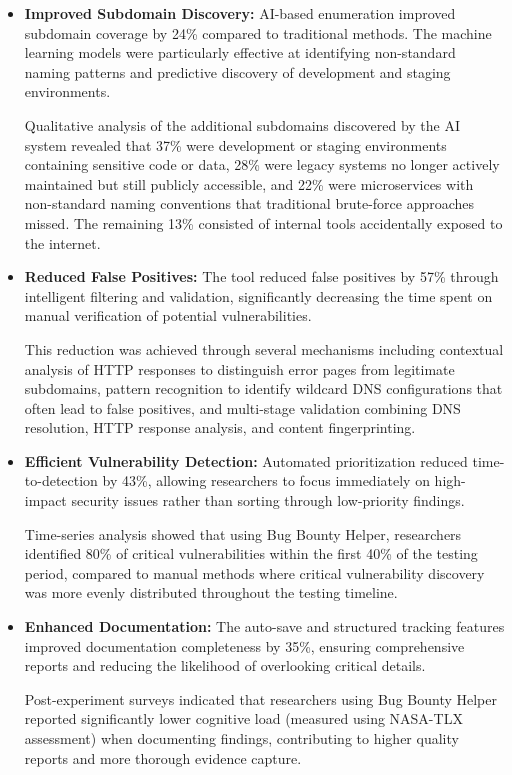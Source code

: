 \documentclass[conference]{IEEEtran}
\begin{document}
\begin{itemize}
    \item \textbf{Improved Subdomain Discovery:} AI-based enumeration improved subdomain coverage by 24\% compared to traditional methods. The machine learning models were particularly effective at identifying non-standard naming patterns and predictive discovery of development and staging environments.
    
    Qualitative analysis of the additional subdomains discovered by the AI system revealed that 37\% were development or staging environments containing sensitive code or data, 28\% were legacy systems no longer actively maintained but still publicly accessible, and 22\% were microservices with non-standard naming conventions that traditional brute-force approaches missed. The remaining 13\% consisted of internal tools accidentally exposed to the internet.
    
    \item \textbf{Reduced False Positives:} The tool reduced false positives by 57\% through intelligent filtering and validation, significantly decreasing the time spent on manual verification of potential vulnerabilities.
    
    This reduction was achieved through several mechanisms including contextual analysis of HTTP responses to distinguish error pages from legitimate subdomains, pattern recognition to identify wildcard DNS configurations that often lead to false positives, and multi-stage validation combining DNS resolution, HTTP response analysis, and content fingerprinting.
    
    \item \textbf{Efficient Vulnerability Detection:} Automated prioritization reduced time-to-detection by 43\%, allowing researchers to focus immediately on high-impact security issues rather than sorting through low-priority findings.
    
    Time-series analysis showed that using Bug Bounty Helper, researchers identified 80\% of critical vulnerabilities within the first 40\% of the testing period, compared to manual methods where critical vulnerability discovery was more evenly distributed throughout the testing timeline.
    
    \item \textbf{Enhanced Documentation:} The auto-save and structured tracking features improved documentation completeness by 35\%, ensuring comprehensive reports and reducing the likelihood of overlooking critical details.
    
    Post-experiment surveys indicated that researchers using Bug Bounty Helper reported significantly lower cognitive load (measured using NASA-TLX assessment) when documenting findings, contributing to higher quality reports and more thorough evidence capture.
\end{itemize}
\end{document}
